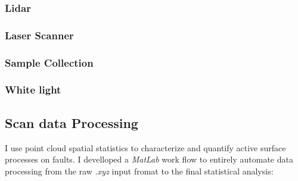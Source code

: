\documentclass[12pt,a4paper]{article}
\begin{document}
		\subsubsection{Lidar}
		\subsubsection{Laser Scanner}
		\subsubsection{Sample Collection}
		\subsubsection{White light}

	\subsection{Scan data Processing}

I use point cloud spatial statistics to characterize and quantify active surface processes on faults. I develloped a \textit{MatLab} work flow to entirely automate data processing from the raw \textit{.xyz} input fromat to the final statistical analysis:
\end{document}
